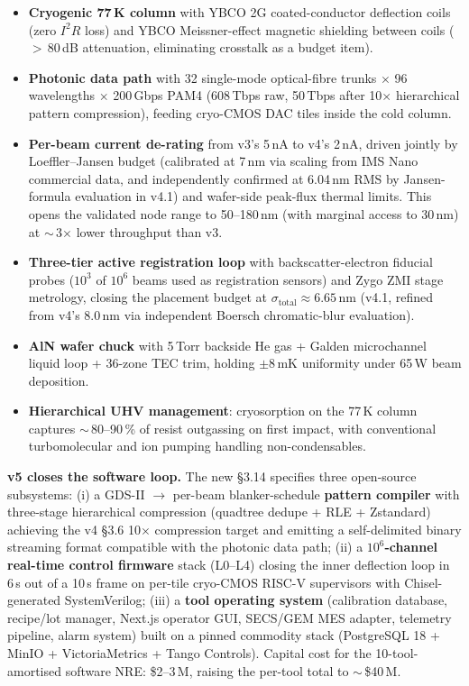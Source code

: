 \documentclass[11pt,letterpaper]{article}
\begin{document}
\begin{itemize}[leftmargin=1.6em]
  \item \textbf{Cryogenic 77\,K column} with YBCO 2G coated-conductor deflection coils (zero $I^2R$ loss) and YBCO Meissner-effect magnetic shielding between coils ($>$\,80\,dB attenuation, eliminating crosstalk as a budget item).
  \item \textbf{Photonic data path} with 32 single-mode optical-fibre trunks $\times$ 96 wavelengths $\times$ 200\,Gbps PAM4 (608\,Tbps raw, 50\,Tbps after 10$\times$ hierarchical pattern compression), feeding cryo-CMOS DAC tiles inside the cold column.
  \item \textbf{Per-beam current de-rating} from v3's 5\,nA to v4's 2\,nA, driven jointly by Loeffler--Jansen budget (calibrated at 7\,nm via scaling from IMS Nano commercial data, and independently confirmed at 6.04\,nm RMS by Jansen-formula evaluation in v4.1) and wafer-side peak-flux thermal limits. This opens the validated node range to 50--180\,nm (with marginal access to 30\,nm) at $\sim$\,3$\times$ lower throughput than v3.
  \item \textbf{Three-tier active registration loop} with backscatter-electron fiducial probes ($10^3$ of $10^6$ beams used as registration sensors) and Zygo ZMI stage metrology, closing the placement budget at $\sigma_\text{total} \approx 6.65$\,nm (v4.1, refined from v4's 8.0\,nm via independent Boersch chromatic-blur evaluation).
  \item \textbf{AlN wafer chuck} with 5\,Torr backside He gas + Galden microchannel liquid loop + 36-zone TEC trim, holding $\pm 8$\,mK uniformity under 65\,W beam deposition.
  \item \textbf{Hierarchical UHV management}: cryosorption on the 77\,K column captures $\sim$\,80--90\,\% of resist outgassing on first impact, with conventional turbomolecular and ion pumping handling non-condensables.
\end{itemize}

\textbf{v5 closes the software loop.} The new \S 3.14 specifies three open-source subsystems: (i) a GDS-II $\to$ per-beam blanker-schedule \textbf{pattern compiler} with three-stage hierarchical compression (quadtree dedupe + RLE + Zstandard) achieving the v4 \S 3.6 10$\times$ compression target and emitting a self-delimited binary streaming format compatible with the photonic data path; (ii) a \textbf{$10^6$-channel real-time control firmware} stack (L0--L4) closing the inner deflection loop in 6\,\textmu s out of a 10\,\textmu s frame on per-tile cryo-CMOS RISC-V supervisors with Chisel-generated SystemVerilog; (iii) a \textbf{tool operating system} (calibration database, recipe/lot manager, Next.js operator GUI, SECS/GEM MES adapter, telemetry pipeline, alarm system) built on a pinned commodity stack (PostgreSQL 18 + MinIO + VictoriaMetrics + Tango Controls). Capital cost for the 10-tool-amortised software NRE: \$2--3\,M, raising the per-tool total to $\sim$\,\$40\,M.
\end{document}
